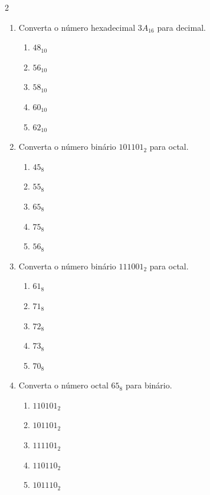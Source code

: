 \documentclass[a4paper,12pt]{article}
\begin{document}
\begin{multicols}{2}
\begin{enumerate}[leftmargin=*]
\vspace{0.2cm}

\item Converta o número hexadecimal $3A_{16}$ para decimal.

\begin{enumerate}[label=(\Alph*)]
    \item $48_{10}$
    \item $56_{10}$
    \item $58_{10}$
    \item $60_{10}$
    \item $62_{10}$
\end{enumerate}

\vspace{0.2cm}


\item Converta o número binário $101101_2$ para octal.

\begin{enumerate}[label=(\Alph*)]
    \item $45_8$
    \item $55_8$
    \item $65_8$
    \item $75_8$
    \item $56_8$
\end{enumerate}

\vspace{0.2cm}

\item Converta o número binário $111001_2$ para octal.

\begin{enumerate}[label=(\Alph*)]
    \item $61_8$
    \item $71_8$
    \item $72_8$
    \item $73_8$
    \item $70_8$
\end{enumerate}

\vspace{0.2cm}

\item Converta o número octal $65_8$ para binário.

\begin{enumerate}[label=(\Alph*)]
    \item $110101_2$
    \item $101101_2$
    \item $111101_2$
    \item $110110_2$
    \item $101110_2$
\end{enumerate}


\end{enumerate}
\end{multicols}
\end{document}
